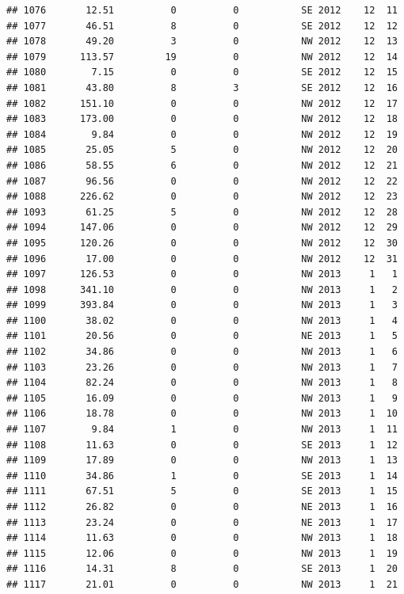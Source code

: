 \documentclass[
]{article}
\begin{document}
\begin{verbatim}
## 1076       12.51          0          0           SE 2012    12  11
## 1077       46.51          8          0           SE 2012    12  12
## 1078       49.20          3          0           NW 2012    12  13
## 1079      113.57         19          0           NW 2012    12  14
## 1080        7.15          0          0           SE 2012    12  15
## 1081       43.80          8          3           SE 2012    12  16
## 1082      151.10          0          0           NW 2012    12  17
## 1083      173.00          0          0           NW 2012    12  18
## 1084        9.84          0          0           NW 2012    12  19
## 1085       25.05          5          0           NW 2012    12  20
## 1086       58.55          6          0           NW 2012    12  21
## 1087       96.56          0          0           NW 2012    12  22
## 1088      226.62          0          0           NW 2012    12  23
## 1093       61.25          5          0           NW 2012    12  28
## 1094      147.06          0          0           NW 2012    12  29
## 1095      120.26          0          0           NW 2012    12  30
## 1096       17.00          0          0           NW 2012    12  31
## 1097      126.53          0          0           NW 2013     1   1
## 1098      341.10          0          0           NW 2013     1   2
## 1099      393.84          0          0           NW 2013     1   3
## 1100       38.02          0          0           NW 2013     1   4
## 1101       20.56          0          0           NE 2013     1   5
## 1102       34.86          0          0           NW 2013     1   6
## 1103       23.26          0          0           NW 2013     1   7
## 1104       82.24          0          0           NW 2013     1   8
## 1105       16.09          0          0           NW 2013     1   9
## 1106       18.78          0          0           NW 2013     1  10
## 1107        9.84          1          0           NW 2013     1  11
## 1108       11.63          0          0           SE 2013     1  12
## 1109       17.89          0          0           NW 2013     1  13
## 1110       34.86          1          0           SE 2013     1  14
## 1111       67.51          5          0           SE 2013     1  15
## 1112       26.82          0          0           NE 2013     1  16
## 1113       23.24          0          0           NE 2013     1  17
## 1114       11.63          0          0           NW 2013     1  18
## 1115       12.06          0          0           NW 2013     1  19
## 1116       14.31          8          0           SE 2013     1  20
## 1117       21.01          0          0           NW 2013     1  21

\end{verbatim}
\end{document}
